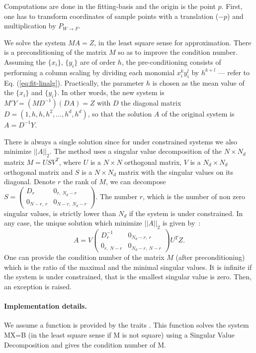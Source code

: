 Computations are done in the fitting-basis and the origin is the point
$p$. First, one has to transform coordinates of sample points with a
translation ($-p$) and multiplication by $ P_{W\rightarrow F}$.


We solve the system $MA=Z$, in the least square sense for
approximation. There is a preconditioning of the matrix $M$ so as to
improve the condition number. Assuming the $\{x_i\}$, $\{y_i\}$ are of
order $h$, the pre-conditioning consists of performing a column
scaling by dividing each monomial $x_i^ky_i^l$ by $h^{k+l}$ --- refer
to Eq. (\ref{eq:fit-linalg}). Practically, the parameter $h$ is chosen
as the mean value of the $\{x_i\}$ and $\{y_i\}$. In other words, the
new system is $M'Y=(MD^{-1})(DA)=Z$ with $D$ the diagonal matrix
$D=(1,h,h,h^2,\ldots,h^d,h^d)$, so that the solution $A$ of the
original system is $A=D^{-1}Y$.

There is always a single solution since for under constrained systems
we also minimize $||A||_2$.  The method uses a singular value
decomposition of the $N\times N_d$ matrix $M= U S V^T$, where $U$ is a
$N \times N$ orthogonal matrix, $V$ is a $N_d \times N_d$ orthogonal
matrix and $S$ is a $N\times N_d$ matrix with the singular values on
its diagonal. Denote $r$ the rank of $M$, we can decompose
%
$S= \left( \begin{array}{cc}
D_r & 0_{r,\ N_d-r}\\
0_{N-r,\ r} & 0_{N-r,\ N_d-r}
\end{array} 
\right).
$
%
The number $r$, which is the number of non zero singular values, is
strictly lower than $N_d$ if the system is under constrained. In any
case, the unique solution which minimize $||A||_2$ is given by~:
\begin{equation}
A= V
\left( \begin{array}{cc}
D_r^{-1} & 0_{N_d-r,\ r}\\
0_{r,\ N-r} & 0_{N_d-r,\ N-r}
\end{array} 
\right)
 U^TZ.
\end{equation}
One can provide the condition number of the matrix $M$ (after
preconditioning) which is the ratio of the maximal and the minimal
singular values. It is infinite if the system is under constrained,
that is the smallest singular value is zero. Then, an exception is
raised.

\paragraph{Implementation details.}
We assume a  function is provided by the traits
. This function solves the system MX=B (in the least square sense
if M is not square) using a Singular Value Decomposition and gives the
condition number of M. 

